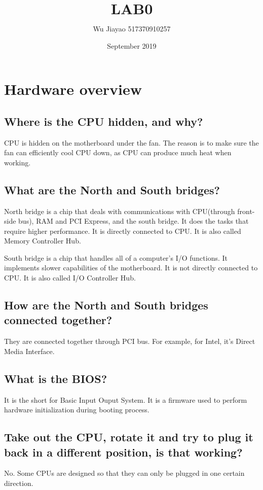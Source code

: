 \documentclass{article}
\title{$\textbf{LAB0}$}
\author{Wu Jiayao 517370910257 }
\date{September 2019}
\begin{document}
\maketitle
\section{Hardware overview}
\subsection{Where is the CPU hidden, and why?}
    \par CPU is hidden on the motherboard under the fan. The reason is to make sure the fan can efficiently cool CPU down, as CPU can produce much heat when working.
\subsection{What are the North and South bridges?}
    \par North bridge is a chip that deals with communications with CPU(through front-side bus), RAM and PCI Express, and the south bridge. It does the tasks that require higher performance. It is directly connected to CPU. It is also called Memory Controller Hub.
    \par South bridge is a chip that handles all of a computer's I/O functions. It implements slower capabilities of the motherboard. It is not directly connected to CPU. It is also called I/O Controller Hub.
\subsection{How are the North and South bridges connected together?}
    \par They are connected together through PCI bus. For example, for Intel, it's Direct Media Interface.
\subsection{What is the BIOS?}
    \par It is the short for Basic Input Ouput System. It is a firmware used to perform hardware initialization during booting process.
\subsection{Take out the CPU, rotate it and try to plug it back in a different position, is that working?}
    \par No. Some CPUs are designed so that they can only be plugged in one certain direction.
\end{document}
